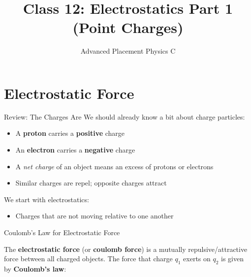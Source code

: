 \documentclass[12pt,aspectratio=169]{beamer}
\title{Class 12: Electrostatics Part 1 (Point Charges)}
\subtitle{Advanced Placement Physics C}
\begin{document}
\begin{frame}
  \maketitle
\end{frame}


\section{Electrostatic Force}

\begin{frame}{Review: The Charges Are}
  We should already know a bit about charge particles:
  \begin{itemize}
  \item A \textbf{proton} carries a \textbf{positive} charge
  \item An \textbf{electron} carries a \textbf{negative} charge
  \item A \emph{net charge} of an object means an excess of protons or electrons
  \item Similar charges are repel; opposite charges attract
  \end{itemize}

  \vspace{.2in}We start with electrostatics:
  \begin{itemize}
  \item Charges that are not moving relative to one another
  \end{itemize}
\end{frame}



\begin{frame}{Coulomb's Law for Electrostatic Force}
  \begin{center}
  \end{center}
  The \textbf{electrostatic force} (or \textbf{coulomb force}) is a mutually
  repulsive/attractive force between all charged objects. The force that charge
  $q_1$ exerts on $q_2$ is given by \textbf{Coulomb's law}:

\end{frame}
\end{document}
